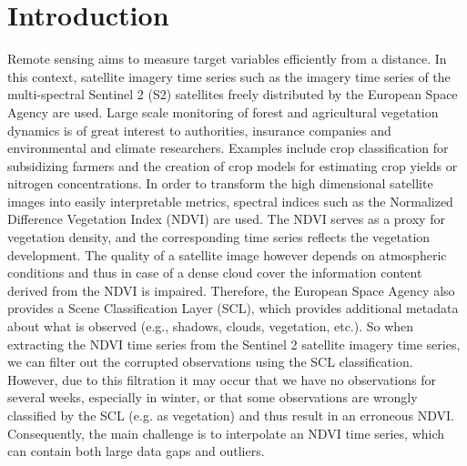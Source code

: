 \chapter{Introduction}

Remote sensing aims to measure target variables efficiently from a distance. In this context, satellite imagery time series such as the imagery time series of the multi-spectral Sentinel 2 (S2) satellites freely distributed by the European Space Agency are used.
Large scale monitoring of forest and agricultural vegetation dynamics is of great interest to authorities, insurance companies and environmental and climate researchers. Examples include crop classification for subsidizing farmers and the creation of crop models for estimating crop yields or nitrogen concentrations. 
In order to transform the high dimensional satellite images into easily interpretable metrics, spectral indices such as the Normalized Difference Vegetation Index (NDVI) are used. The NDVI serves as a proxy for vegetation density, and the corresponding time series reflects the vegetation development. 
The quality of a satellite image however depends on atmospheric conditions and thus in case of a dense cloud cover the information content derived from the NDVI is impaired. Therefore, the European Space Agency also provides a Scene Classification Layer (SCL), which provides additional metadata about what is observed (e.g., shadows, clouds, vegetation, etc.). So when extracting the NDVI time series from the Sentinel 2 satellite imagery time series, we can filter out the corrupted observations using the SCL classification. However, due to this filtration it may occur that we have no observations for several weeks, especially in winter, or that some observations are wrongly classified by the SCL (e.g. as vegetation) and thus result in an erroneous NDVI. Consequently, the main challenge is to interpolate an NDVI time series, which can contain both large data gaps and outliers. 

